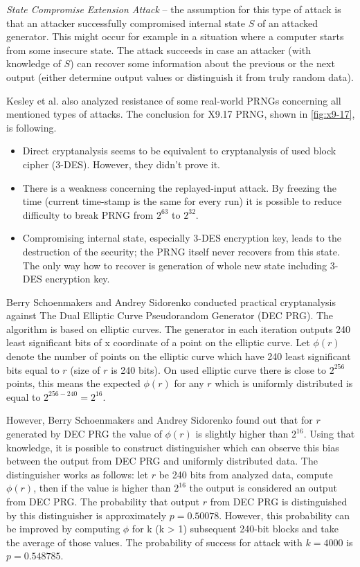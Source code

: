 \documentclass[
    digital,    %
    oneside,    %
    color,
    11pt,
    nocover,
    notable,
    nolof,
    nolot,
    final
]{fithesis3}
\renewcommand\_{\textunderscore\allowbreak}
\begin{document}
\textit{State Compromise Extension Attack} -- the assumption for this type of attack is that an attacker successfully compromised internal state $S$ of an attacked generator. This might occur for example in a situation where a computer starts from some insecure state. The attack succeeds in case an attacker (with knowledge of $S$) can recover some information about the previous or the next output (either determine output values or distinguish it from truly random data). 

Kesley et al. \cite{kelsey1998cryptanalytic} also analyzed resistance of some real-world PRNGs concerning all mentioned types of attacks. The conclusion for X9.17 PRNG, shown in \cref{fig:x9-17}, is following.

\begin{itemize}
	\item Direct cryptanalysis seems to be equivalent to cryptanalysis of used block cipher (3-DES). However, they didn't prove it.
	
	\item There is a weakness concerning the replayed-input attack. By freezing the time (current time-stamp is the same for every run) it is possible to reduce difficulty to break PRNG from $2^{63}$ to $2^{32}$.
	
	\item Compromising internal state, especially 3-DES encryption key, leads to the destruction of the security; the PRNG itself never recovers from this state. The only way how to recover is generation of whole new state including 3-DES encryption key.
\end{itemize}

Berry Schoenmakers and Andrey Sidorenko conducted practical cryptanalysis \cite{practical-cryptanalysis} against The Dual Elliptic Curve Pseudorandom Generator (DEC PRG)\cite{barker2007recommendation}. The algorithm is based on elliptic curves. The generator in each iteration outputs 240 least significant bits of x coordinate of a point on the elliptic curve. Let $\phi (r)$ denote the number of points on the elliptic curve which have 240 least significant bits equal to $ r $ (size of $ r $ is 240 bits). On used elliptic curve there is close to $2^{256}$ points, this means the expected $\phi (r)$ for any $ r $ which is uniformly distributed is equal to $2^{256 - 240} = 2^{16}$. 

However, Berry Schoenmakers and Andrey Sidorenko found out that for $ r $ generated by DEC PRG the value of $\phi (r)$ is slightly higher than $2^{16}$. Using that knowledge, it is possible to construct distinguisher which can observe this bias between the output from DEC PRG and uniformly distributed data. The distinguisher works as follows: let $ r $ be 240 bits from analyzed data, compute $\phi (r)$, then if the value is higher than $2^{16}$ the output is considered an output from DEC PRG. The probability that output $ r $ from DEC PRG is distinguished by this distinguisher is approximately $ p = 0.50078 $. However, this probability can be improved by computing $\phi$ for k (k > 1) subsequent 240-bit blocks and take the average of those values. The probability of success for attack with $ k = 4000 $ is $ p = 0.548785 $.
\end{document}
